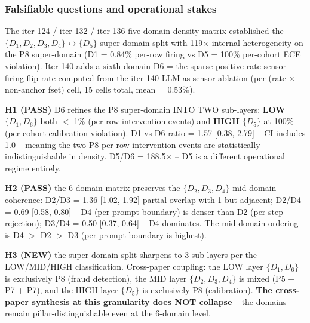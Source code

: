 %

\subsubsection{Falsifiable questions and operational stakes}
The iter-124 / iter-132 / iter-136 five-domain density matrix
established the $\{D_1, D_2, D_3, D_4\} \leftrightarrow \{D_5\}$
super-domain split with 119$\times$ internal heterogeneity on
the P8 super-domain (D1 = 0.84\% per-row firing vs D5 = 100\%
per-cohort ECE violation).  Iter-140 adds a sixth domain D6 = the
sparse-positive-rate sensor-firing-flip rate computed from the
iter-140 LLM-as-sensor ablation (per (rate $\times$ non-anchor
fset) cell, 15 cells total, mean = 0.53\%).

\textbf{H1 (PASS)} D6 refines the P8 super-domain INTO TWO sub-layers:
\textbf{LOW} $\{D_1, D_6\}$ both $<$ 1\% (per-row intervention events) and
\textbf{HIGH} $\{D_5\}$ at 100\% (per-cohort calibration violation).
D1 vs D6 ratio = 1.57 [0.38, 2.79] -- CI includes 1.0 -- meaning the
two P8 per-row-intervention events are statistically indistinguishable
in density.  D5/D6 = 188.5$\times$ -- D5 is a different operational
regime entirely.

\textbf{H2 (PASS)} the 6-domain matrix preserves the $\{D_2, D_3, D_4\}$
mid-domain coherence: D2/D3 = 1.36 [1.02, 1.92] partial overlap with 1
but adjacent; D2/D4 = 0.69 [0.58, 0.80] -- D4 (per-prompt boundary) is
denser than D2 (per-step rejection); D3/D4 = 0.50 [0.37, 0.64] --
D4 dominates.  The mid-domain ordering is D4 $>$ D2 $>$ D3 (per-prompt
boundary is highest).

\textbf{H3 (NEW)} the super-domain split sharpens to 3 sub-layers per
the LOW/MID/HIGH classification.  Cross-paper coupling: the LOW layer
$\{D_1, D_6\}$ is exclusively P8 (fraud detection), the MID layer
$\{D_2, D_3, D_4\}$ is mixed (P5 + P7 + P7), and the HIGH layer $\{D_5\}$
is exclusively P8 (calibration).  \textbf{The cross-paper synthesis at
this granularity does NOT collapse} -- the domains remain
pillar-distinguishable even at the 6-domain level.

